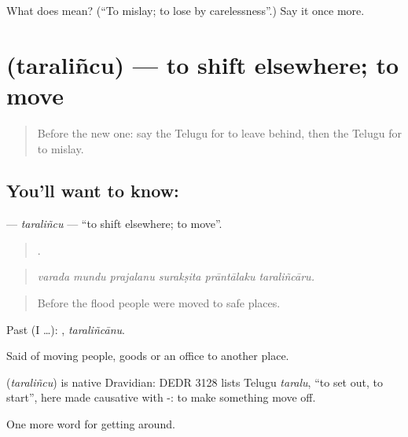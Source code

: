 \begin{tcolorbox}[breakable,colback=teal!4,colframe=teal!35!black,title={Before you move on}]
What does  mean? (\textquotedblleft{}To mislay; to lose by carelessness\textquotedblright{}.) Say it once more.
\end{tcolorbox}
\section[\texorpdfstring{\te{తరలించు} (taraliñcu)}{తరలించు (taraliñcu)}]{ (taraliñcu) — to shift elsewhere; to move}

\label{lesson:TE-C461-taralincu}



\begin{quote}
Before the new one: say the Telugu for to leave behind, then the Telugu for to mislay.
\end{quote}

\subsection*{You'll want to know: }
\textbf{} — \emph{taraliñcu} — \textquotedblleft{}to shift elsewhere; to move\textquotedblright{}.

\begin{quote}
     .
\end{quote}

\begin{quote}
\emph{varada mundu prajalanu surakṣita prāntālaku taraliñcāru.}
\end{quote}

\begin{quote}
Before the flood people were moved to safe places.
\end{quote}

Past (I …): , \emph{taraliñcānu}.

Said of moving people, goods or an office to another place.

\begin{cousinweb}
\textbf{} (\emph{taraliñcu}) is native Dravidian: DEDR 3128 lists Telugu \emph{taralu}, \textquotedblleft{}to set out, to start\textquotedblright{}, here made causative with -: to make something move off.
\end{cousinweb}

\begin{grammarlens}[title={What you've built}]
One more word for getting around.
\end{grammarlens}

